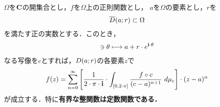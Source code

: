 	\begin{screen}
		\begin{thm}[Liouvilleの定理]\label{thm:Liouville_theorem}
			$\Omega$を$\mathbf{C}$の開集合とし，$f$を$\Omega$上の正則関数とし，
			$a$を$\Omega$の要素とし，$r$を
			\begin{align}
				\overline{D}(a;r) \subset \Omega
			\end{align}
			を満たす正の実数とする．このとき，
			\begin{align}
				[0,2\cdot\pi] \ni \theta \longmapsto a + r \cdot e^{\isym \cdot \theta}
			\end{align}
			なる写像を$c$とすれば，$D(a;r)$の各要素$z$で
			\begin{align}
				f(z) = \sum_{n=0}^{\infty} \left[ \frac{1}{2\cdot\pi\cdot\mathbf{i}} \cdot \int_{[0,2\cdot\pi]} \frac{f \circ c}{(c - a)^{n+1}}\ d\mu_{c} \right] \cdot (z-a)^{n}
			\end{align}
			が成立する．特に{\bf 有界な整関数は定数関数である．}
		\end{thm}
	\end{screen}
	
